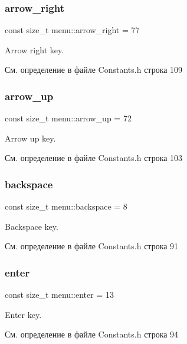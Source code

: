 \subsubsection{\texorpdfstring{arrow\+\_\+right}{arrow\_right}}
{\footnotesize\ttfamily const size\+\_\+t menu\+::arrow\+\_\+right = 77}

Arrow right key. 

См. определение в файле Constants.\+h строка 109

\mbox{\label{namespacemenu_a5e6bc193fc3cb9a0cfce7370a1578aeb}} 
\subsubsection{\texorpdfstring{arrow\+\_\+up}{arrow\_up}}
{\footnotesize\ttfamily const size\+\_\+t menu\+::arrow\+\_\+up = 72}

Arrow up key. 

См. определение в файле Constants.\+h строка 103

\mbox{\label{namespacemenu_af10d26be126a6efaa57428f629514f93}} 
\subsubsection{\texorpdfstring{backspace}{backspace}}
{\footnotesize\ttfamily const size\+\_\+t menu\+::backspace = 8}

Backspace key. 

См. определение в файле Constants.\+h строка 91

\mbox{\label{namespacemenu_a9ca2724b99053483cb2af7b49563db95}} 
\subsubsection{\texorpdfstring{enter}{enter}}
{\footnotesize\ttfamily const size\+\_\+t menu\+::enter = 13}

Enter key. 

См. определение в файле Constants.\+h строка 94

\mbox{\label{namespacemenu_a31d13ed09dc59c7220146bd432fc3787}} 
